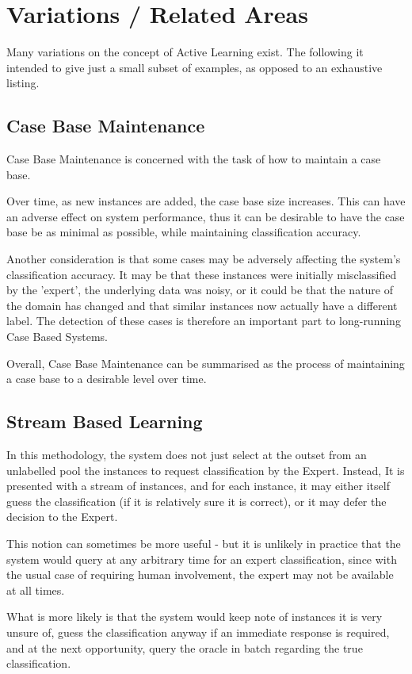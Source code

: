 \documentclass[a4paper,11pt]{report}
\begin{document}
\section{Variations / Related Areas}
Many variations on the concept of Active Learning exist. The following it intended to give just a small subset of examples, as opposed to an exhaustive listing.

\subsection{Case Base Maintenance}
Case Base Maintenance is concerned with the task of how to maintain a case base. 

Over time, as new instances are added, the case base size increases. This can have an adverse effect on system performance, thus it can be desirable to have the case base be as minimal as possible, while maintaining classification accuracy.

Another consideration is that some cases may be adversely affecting the system's classification accuracy. It may be that these instances were initially misclassified by the 'expert', the underlying data was noisy, or it could be that the nature of the domain has changed and that similar instances now actually have a different label. The detection of these cases is therefore an important part to long-running Case Based Systems.

Overall, Case Base Maintenance can be summarised as the process of maintaining a case base to a desirable level over time.

\subsection{Stream Based Learning}
In this methodology, the system does not just select at the outset from an unlabelled pool the instances to request classification by the Expert. Instead, It is presented with a stream of instances, and for each instance, it may either itself guess the classification (if it is relatively sure it is correct), or it may defer the decision to the Expert.

This notion can sometimes be more useful - but it is unlikely in practice that the system would query at any arbitrary time for an expert classification, since with the usual case of requiring human involvement, the expert may not be available at all times.

What is more likely is that the system would keep note of instances it is very unsure of, guess the classification anyway if an immediate response is required, and at the next opportunity, query the oracle in batch regarding the true classification.
\end{document}
